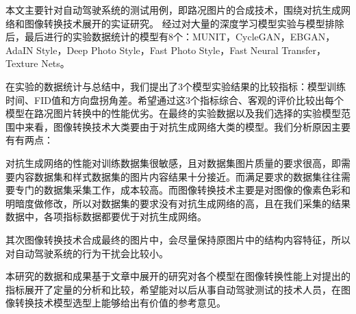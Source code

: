 \begin{conclusions}

本文主要针对自动驾驶系统的测试用例，即路况图片的合成技术，围绕对抗生成网络和图像转换技术展开的实证研究。
经过对大量的深度学习模型实验与模型排除后，最后进行的实验数据统计的模型有8个：MUNIT，CycleGAN，EBGAN，AdaIN Style，Deep Photo Style，Fast Photo Style，Fast Neural Transfer，Texture Nets。

在实验的数据统计与总结中，我们提出了3个模型实验结果的比较指标：模型训练时间、FID值和方向盘拐角差。希望通过这3个指标综合、客观的评价比较出每个模型在路况图片转换中的性能优劣。在最终的实验数据以及我们选择的实验模型范围中来看，图像转换技术大类要由于对抗生成网络大类的模型。我们分析原因主要有有两点：

对抗生成网络的性能对训练数据集很敏感，且对数据集图片质量的要求很高，即需要内容数据集和样式数据集的图片内容结果十分接近。而满足要求的数据集往往需要专门的数据集采集工作，成本较高。而图像转换技术主要是对图像的像素色彩和明暗度做修改，所以对数据集的要求没有对抗生成网络的高，且在我们采集的结果数据中，各项指标数据都要优于对抗生成网络。

其次图像转换技术合成最终的图片中，会尽量保持原图片中的结构内容特征，所以对自动驾驶系统的行为干扰会比较小。

本研究的数据和成果基于文章中展开的研究对各个模型在图像转换性能上对提出的指标展开了定量的分析和比较，希望能对以后从事自动驾驶测试的技术人员，在图像转换技术模型选型上能够给出有价值的参考意见。

\end{conclusions}
